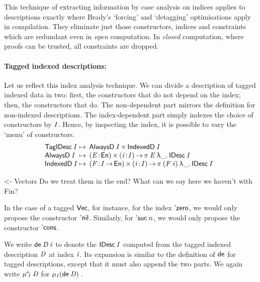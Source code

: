 This technique of extracting information by case analysis on indices
applies to descriptions exactly where Brady's `forcing' and
`detagging' optimisations apply in compilation. They eliminate just
those constructors, indices and constraints which are redundant even
in \emph{open} computation. In \emph{closed} computation, where proofs
can be trusted, all constraints are dropped.


\paragraph{Tagged indexed descriptions:}

\newcommand{\SYMBmuide}{\D{\({\mu}^{\!+}\)}\xspace}
\newcommand{\muide}[2]{\SYMBmuide\!\!_{#1}\:#2}

Let us reflect this index analysis technique.
We can divide a description of tagged indexed data in two: first, the
constructors that do not depend on the index; then, the constructors
that do. The non-dependent part mirrors the definition for non-indexed
descriptions. The index-dependent part simply indexes the choice of
constructors by $\V{I}$. Hence, by inspecting the index, it is
possible to vary the `menu' of constructors.
%
\[
\begin{array}{@{}l@{\:\mapsto\:\:}l}
 \TagIDesc{\V{I}}  & \TIMES{\ATagIDesc{\V{I}}}{\ITagIDesc{\V{I}}} \\
 \ATagIDesc{\V{I}} & \SIGMA{\V{E}}{\EnumU} \PI{\V{i}}{\V{I}} \spi{\V{E}}{\LAM{\_} \IDesc{\V{I}}} \\
 \ITagIDesc{\V{I}} & 
     \SIGMA{\V{F}}{\V{I} \To \EnumU} \PI{\V{i}}{\V{I}} \spi{(\V{F}\: \V{i})}{\LAM{\_} \IDesc{\V{I}}} 
\end{array}
\]

\begin{wstructure}
<- Vectors
    Do we treat them in the end? 
    What can we say here we haven't with Fin?
\end{wstructure}

In the case of a tagged $\D{Vec}$, for instance, for the index
$\NatZero$, we would only propose the constructor
$\ListNil$. Similarly, for $\NatSuc{n}$, we would only propose the
constructor $\SYMBListCons$.

We write $\toIDesc{\V{D}}\:\V{i}$ to denote the $\IDesc{\V{I}}$
computed from the tagged indexed description $\V{D}$ at index
$\V{i}$. Its expansion is similar to the definition of \(\SYMBtoDesc\)
for tagged descriptions, except that it must also append the two parts.
We again write $\muide{\V{I}}{\V{D}}$ for
$\IMu{\V{I}}{(\toIDesc{\V{D}})}$.

